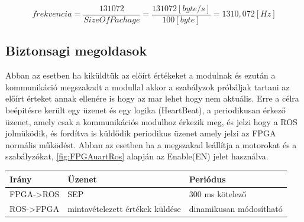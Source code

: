 \begin{equation}
    frekvencia = \frac{131072}{SizeOfPachage}=\frac{131072[byte/s]}{100[byte]}=1310,072 [Hz]
\end{equation}

\subsection{Biztonsagi megoldasok}

Abban az esetben ha kiküldtük az előírt értékeket a modulnak és ezután a kommunikáció megszakadt a modullal akkor a szabályzok próbáljak tartani az előírt érteket annak ellenére is hogy az mar lehet hogy nem aktuális. Erre a célra beépitésre került egy üzenet és egy logika (HeartBeat), a periodikusan érkező üzenet, amely csak a kommunikációs modulhoz érkezik meg, és jelzi hogy a ROS jolmüködik, és fordítva is küldődik periodikus üzenet amely jelzi az FPGA normális működést. Abban az esetben ha a  megszakad leállítja a motorokat és a szabályzókat,  \ref{fig:FPGAuartRos} alapján az Enable(EN) jelet használva.

\begin{table}[H]
\center
\begin{tabular}{lll}
\hline Irány   & Üzenet & Periódus    \\ \hline
FPGA->ROS &  SEP        & 300 ms kötelező         \\
ROS->FPGA &  mintavételezett értékek küldése & dinamikusan módosítható                   
\end{tabular}
\end{table}
